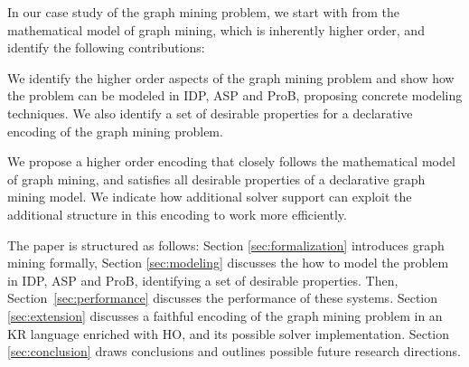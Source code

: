 In our case study of the graph mining problem, we start with from the mathematical model of graph mining, which is inherently higher order, and identify the following contributions:
\begin{compactitem}
\item We identify the higher order aspects of the graph mining problem and show how the problem can be modeled in IDP, ASP and ProB, proposing concrete modeling techniques.
We also identify a set of desirable properties for a declarative encoding of the graph mining problem.
\item 
We propose a higher order encoding that closely follows the mathematical model of graph mining, and satisfies all desirable properties of a declarative graph mining model.
We indicate how additional solver support can exploit the additional structure in this encoding to work more efficiently.
\end{compactitem}
The paper is structured as follows: Section \ref{sec:formalization} introduces graph mining formally, Section \ref{sec:modeling} discusses the how to model the problem in IDP, ASP and ProB, identifying a set of desirable properties.
Then, Section~\ref{sec:performance} discusses the performance of these systems.
Section \ref{sec:extension} discusses a faithful encoding of the graph mining problem in an KR language enriched with HO, and its possible solver implementation. Section \ref{sec:conclusion} draws conclusions and outlines possible future research directions.
